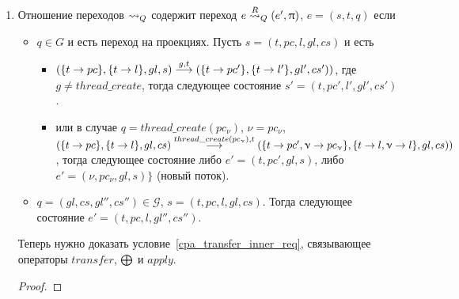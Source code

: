 \begin{enumerate}
\item
Отношение переходов $\leadsto_Q$ содержит переход $e \stackrel{R}{\leadsto}_Q (e', \uppi)$, $e=(s, t, q)$ если
\begin{itemize}
\item $q \in G$ и есть переход на проекциях. Пусть
$s=(t, pc, l, gl, cs)$ и есть
\begin{itemize}
\item $(\{t\to pc\}, \{t\to l\}, gl, s) \stackrel{g,t}{\longrightarrow} (\{t\to pc'\}, \{t\to l'\}, gl', cs'))$, где $g \ne thread\_create$, тогда 
следующее состояние $s' = (t,pc',l', gl',cs')$.
\item или в случае $q=thread\_create(pc_\nu)$, $\nu=pc_\nu$, \\
$(\{t\to pc\}, \{t\to l\}, gl, cs) \stackrel{thread\_create(pc_\upnu), t}{\longrightarrow} (\{t\to pc', \upnu \to pc_\upnu\}, \{t\to l,\upnu \to l\}, gl, cs))$, тогда 
следующее состояние либо $e' = (t,pc',gl,s)$, либо $e' = (\nu,pc_\nu,gl,s)\}$ (новый поток).
\end{itemize}
\item $q=(gl, cs, gl'',cs'') \in \mathcal{G}$, $s=(t, pc, l, gl, cs)$. Тогда следующее состояние $e'=(t, pc, l, gl'', cs'')$.
\end{itemize}

Теперь нужно доказать условие~\ref{cpa_transfer_inner_req}, связывающее операторы $transfer$, $\mathrel{\bigoplus}$ и $apply$.
\begin{proof}


\end{proof}
\end{enumerate}
